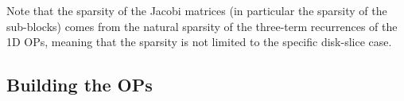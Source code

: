 Note that the sparsity of the Jacobi matrices (in particular the sparsity of the sub-blocks) comes from the natural sparsity of the three-term recurrences of the 1D OPs, meaning that the sparsity is not limited to the specific disk-slice case.




\subsection{Building the OPs} 

